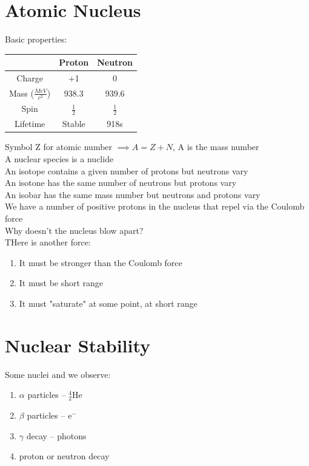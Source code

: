 \documentclass[a4paper, 11pt, fleqn, normalem]{report}
\begin{document}
\section{Atomic Nucleus}
Basic properties:
\begin{table}[H]
    \begin{tabular}{c|c|c}
               & Proton & Neutron   \\
        \hline
        Charge & +1     & 0         \\
        Mass ($\frac{MeV}{c^{2}}$)  & 938.3  & 939.6   \\
        Spin   & $\frac{1}{2}$ & $\frac{1}{2}$ \\
        Lifetime & Stable & 918s
    \end{tabular}
\end{table}
Symbol Z for atomic number $\implies A = Z + N$, A is the mass number \\
A nuclear species is a nuclide \\
An isotope contains a given number of protons but neutrons vary \\
An isotone has the same number of neutrons but protons vary \\
An isobar has the same mass number but neutrons and protons vary \\
We have a number of positive protons in the nucleus that repel via the Coulomb force \\
Why doesn't the nucleus blow apart? \\
THere is another force:
\begin{enumerate}
    \item It must be stronger than the Coulomb force
    \item It must be short range
    \item It must "saturate" at some point, at short range
\end{enumerate}

\section{Nuclear Stability}
Some nuclei and we observe:
\begin{enumerate}
    \item $\alpha$ particles -- $_{2}^{4}$He
    \item $\beta$ particles -- e$^{-}$
    \item $\gamma$ decay -- photons
    \item proton or neutron decay
\end{enumerate}
\end{document}
